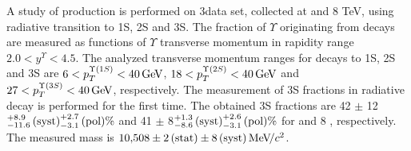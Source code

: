 A study of \chib production is performed on 3\invfb data set, collected
at  and 8 TeV, using \chib radiative transition to
\Y1S, \Y2S and \Y3S. The fraction of $\Upsilon$ originating from \chib decays
are measured as functions of $\Upsilon$ transverse momentum in rapidity range
$2.0 < y^{\Upsilon} < 4.5$. The analyzed transverse momentum ranges for decays
to \Y1S, \Y2S and \Y3S are $6<p_T^{\Y1S}<40\gev$, $18<p_T^{\Y2S}<40\gev$ and
$27<p_T^{\Y3S}<40\gev$, respectively. The measurement of
\Y3S fractions in radiative \chibThreeP decay is performed for the first time.
The obtained \Y3S fractions are 42 $\pm$ 12\stat${}^{+8.9}_{-11.6}\mathrm{\,(syst)}^{+2.7}_{-3.1}\mathrm{\,(pol)} \%$ and 41 $\pm$ 8\stat${}^{+1.3}_{-8.6}\mathrm{\,(syst)}^{+2.6}_{-3.1}\mathrm{\,(pol)} \%$ for  and 8 \tev,
respectively. The measured \chiboneThreeP mass is $10{,}508 \pm 2\mathrm{\,(stat)} \pm
8\mathrm{\,(syst)} {\mathrm{\,Me\kern -0.1em V\!/}c^2}$.

